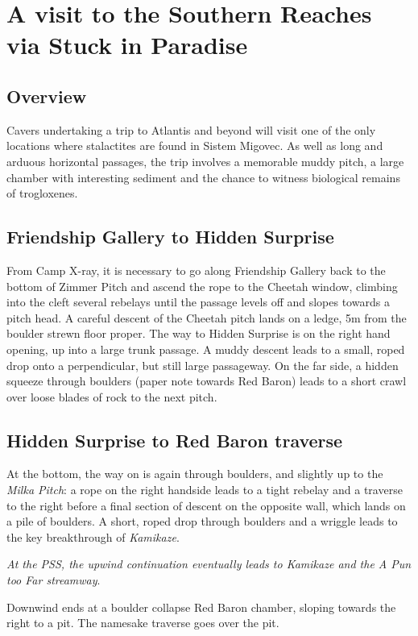 \section{A visit to the Southern Reaches via Stuck in Paradise}

\subsection{Overview} 
Cavers undertaking a trip to Atlantis and beyond will visit one of the only locations where stalactites are found in Sistem Migovec. As well as long and arduous horizontal passages, the trip involves a memorable muddy pitch, a large chamber with interesting sediment and the chance to witness biological remains of trogloxenes.

\subsection{Friendship Gallery to Hidden Surprise}
From Camp X-ray, it is necessary to go along Friendship Gallery back to the bottom of Zimmer Pitch and ascend the rope to the Cheetah window, climbing into the cleft several rebelays until the passage levels off and slopes towards a pitch head. A careful descent of the Cheetah pitch lands on a ledge, 5m from the boulder strewn floor proper. The way to Hidden Surprise is on the right hand opening, up into a large trunk passage. A muddy descent leads to a small, roped drop onto a perpendicular, but still large passageway. On the far side, a hidden squeeze through boulders (paper note towards Red Baron) leads to a short crawl over loose blades of rock to the next pitch.
\subsection{Hidden Surprise to Red Baron traverse}
At the bottom, the way on is again through boulders, and slightly up to the \emph{Milka Pitch}: a rope on the right handside leads to a tight rebelay and a traverse to the right before a final section of descent on the opposite wall, which lands on a pile of boulders. A short, roped drop through boulders and a wriggle leads to the key breakthrough of \emph{Kamikaze}. 

\textit{At the PSS, the upwind continuation eventually leads to \emph{Kamikaze} and the \emph{A Pun too Far} streamway}. 

Downwind ends at a boulder collapse  Red Baron chamber, sloping towards the right to a pit. The namesake traverse goes over the pit.

